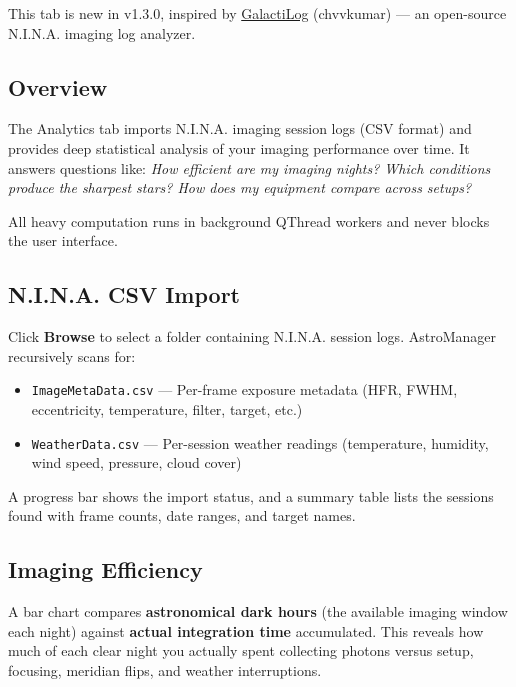 \documentclass[11pt,a4paper]{article}
\begin{document}
\begin{newfeaturebox}[New in v1.3.0]
This tab is new in v1.3.0, inspired by \href{https://github.com/chvvkumar/GalactiLog}{GalactiLog} (chvvkumar) --- an open-source N.I.N.A. imaging log analyzer.
\end{newfeaturebox}

\subsection{Overview}

The Analytics tab imports N.I.N.A. imaging session logs (CSV format) and provides deep statistical analysis of your imaging performance over time. It answers questions like: \emph{How efficient are my imaging nights? Which conditions produce the sharpest stars? How does my equipment compare across setups?}

All heavy computation runs in background QThread workers and never blocks the user interface.

\subsection{N.I.N.A. CSV Import}

Click \textbf{Browse} to select a folder containing N.I.N.A. session logs. AstroManager recursively scans for:

\begin{itemize}
    \item \texttt{ImageMetaData.csv} --- Per-frame exposure metadata (HFR, FWHM, eccentricity, temperature, filter, target, etc.)
    \item \texttt{WeatherData.csv} --- Per-session weather readings (temperature, humidity, wind speed, pressure, cloud cover)
\end{itemize}

A progress bar shows the import status, and a summary table lists the sessions found with frame counts, date ranges, and target names.

\subsection{Imaging Efficiency}

A bar chart compares \textbf{astronomical dark hours} (the available imaging window each night) against \textbf{actual integration time} accumulated. This reveals how much of each clear night you actually spent collecting photons versus setup, focusing, meridian flips, and weather interruptions.
\end{document}
